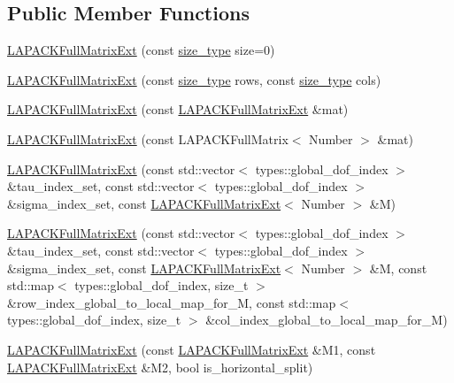 \subsection*{Public Member Functions}
\begin{DoxyCompactItemize}
\item 
\hyperlink{classLAPACKFullMatrixExt_a1d2edf7f0eb1f079e1d9540f89b6584e}{L\+A\+P\+A\+C\+K\+Full\+Matrix\+Ext} (const \hyperlink{classLAPACKFullMatrixExt_a5cf5f4a6104dc17029210b5ca52bf574}{size\+\_\+type} size=0)
\item 
\hyperlink{classLAPACKFullMatrixExt_a82986acedd4e702133151cb9a3ae2c97}{L\+A\+P\+A\+C\+K\+Full\+Matrix\+Ext} (const \hyperlink{classLAPACKFullMatrixExt_a5cf5f4a6104dc17029210b5ca52bf574}{size\+\_\+type} rows, const \hyperlink{classLAPACKFullMatrixExt_a5cf5f4a6104dc17029210b5ca52bf574}{size\+\_\+type} cols)
\item 
\hyperlink{classLAPACKFullMatrixExt_a95c6843f5138c51aa42b554ec843b717}{L\+A\+P\+A\+C\+K\+Full\+Matrix\+Ext} (const \hyperlink{classLAPACKFullMatrixExt}{L\+A\+P\+A\+C\+K\+Full\+Matrix\+Ext} \&mat)
\item 
\hyperlink{classLAPACKFullMatrixExt_adfb752e5770370e4f7ddbd298d873c60}{L\+A\+P\+A\+C\+K\+Full\+Matrix\+Ext} (const L\+A\+P\+A\+C\+K\+Full\+Matrix$<$ Number $>$ \&mat)
\item 
\hyperlink{classLAPACKFullMatrixExt_adcc17e75248175c5d89ba15ee58be954}{L\+A\+P\+A\+C\+K\+Full\+Matrix\+Ext} (const std\+::vector$<$ types\+::global\+\_\+dof\+\_\+index $>$ \&tau\+\_\+index\+\_\+set, const std\+::vector$<$ types\+::global\+\_\+dof\+\_\+index $>$ \&sigma\+\_\+index\+\_\+set, const \hyperlink{classLAPACKFullMatrixExt}{L\+A\+P\+A\+C\+K\+Full\+Matrix\+Ext}$<$ Number $>$ \&M)
\item 
\hyperlink{classLAPACKFullMatrixExt_a6ffdb7d0e8168100762813185480fb10}{L\+A\+P\+A\+C\+K\+Full\+Matrix\+Ext} (const std\+::vector$<$ types\+::global\+\_\+dof\+\_\+index $>$ \&tau\+\_\+index\+\_\+set, const std\+::vector$<$ types\+::global\+\_\+dof\+\_\+index $>$ \&sigma\+\_\+index\+\_\+set, const \hyperlink{classLAPACKFullMatrixExt}{L\+A\+P\+A\+C\+K\+Full\+Matrix\+Ext}$<$ Number $>$ \&M, const std\+::map$<$ types\+::global\+\_\+dof\+\_\+index, size\+\_\+t $>$ \&row\+\_\+index\+\_\+global\+\_\+to\+\_\+local\+\_\+map\+\_\+for\+\_\+M, const std\+::map$<$ types\+::global\+\_\+dof\+\_\+index, size\+\_\+t $>$ \&col\+\_\+index\+\_\+global\+\_\+to\+\_\+local\+\_\+map\+\_\+for\+\_\+M)
\item 
\hyperlink{classLAPACKFullMatrixExt_a98851864591035df275caca76e07ebe3}{L\+A\+P\+A\+C\+K\+Full\+Matrix\+Ext} (const \hyperlink{classLAPACKFullMatrixExt}{L\+A\+P\+A\+C\+K\+Full\+Matrix\+Ext} \&M1, const \hyperlink{classLAPACKFullMatrixExt}{L\+A\+P\+A\+C\+K\+Full\+Matrix\+Ext} \&M2, bool is\+\_\+horizontal\+\_\+split)

\end{DoxyCompactItemize}
